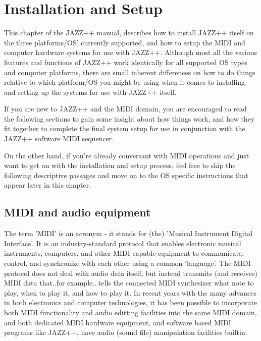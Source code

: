 \documentclass[letterpaper]{report}
\begin{document}

\chapter{Installation and Setup}\label{installation}

This chapter of the JAZZ++ manual, describes how to install JAZZ++ itself
on the three platforms/OS' currently supported, and how to setup the MIDI
and computer hardware systems for use with JAZZ++. Although most all the
various features and functions of JAZZ++ work identically for all supported
OS types and computer platforms, there are small inherent differences on
how to do things relative to which platform/OS you might be using when it 
comes to installing and setting up the systems for use with JAZZ++ itself.

If you are new to JAZZ++ and the MIDI domain, you are encouraged to read the 
following sections to gain some insight about how things work, and how they
fit together to complete the final system setup for use in conjunction with
the JAZZ++ software MIDI sequencer.

On the other hand, if you're already conversant with MIDI operations and just
want to get on with the installation and setup process, feel free to skip the
following descriptive passages and move on to the OS specific instructions
that appear later in this chapter. 


\section{MIDI and audio equipment}

The term 'MIDI' is an acronym - it stands for (the) 'Musical Instrument Digital
Interface'. It is an industry-standard protocol that enables electronic musical
instruments, computers, and other MIDI capable equipment to communicate,
control, and synchronize with each other using a common 'language'. The MIDI
protocol does not deal with audio data itself, but instead transmits (and
receives) MIDI data that..for example...tells the connected MIDI synthesizer
what note to play, when to play it, and how to play it. In recent years with
the many advances in both electronics and computer technologies, it has been
possible to incorporate both MIDI functionality and audio editting facilities
into the same MIDI domain, and both dedicated MIDI hardware equipment, and 
software based MIDI programs like JAZZ++, have audio (sound file) manipulation
facilities builtin.
\end{document}
